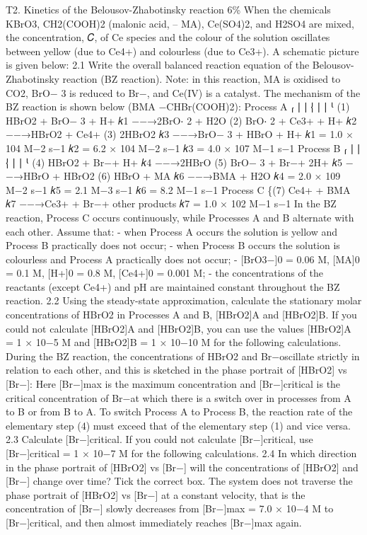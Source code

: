 T2. Kinetics of the Belousov-Zhabotinsky reaction 6\% When the chemicals KBrO3, CH2(COOH)2 (malonic acid, – MA), Ce(SO4)2, and H2SO4 are mixed, the concentration, 𝐶, of Ce species and the colour of the solution oscillates between yellow (due to Ce4+) and colourless (due to Ce3+). A schematic picture is given below: 2.1 Write the overall balanced reaction equation of the Belousov-Zhabotinsky reaction (BZ reaction). Note: in this reaction, MA is oxidised to CO2, BrO− 3 is reduced to Br−, and Ce(IV) is a catalyst. The mechanism of the BZ reaction is shown below (BMA −CHBr(COOH)2): Process A ⎧ ⎪ ⎪ ⎨ ⎪ ⎪ ⎩ (1) HBrO2 + BrO− 3 + H+ 𝑘1 −−→2BrO⋅ 2 + H2O (2) BrO⋅ 2 + Ce3+ + H+ 𝑘2 −−→HBrO2 + Ce4+ (3) 2HBrO2 𝑘3 −−→BrO− 3 + HBrO + H+ 𝑘1 = 1.0 × 104 M−2 s−1 𝑘2 = 6.2 × 104 M−2 s−1 𝑘3 = 4.0 × 107 M−1 s−1 Process B ⎧ ⎪ ⎪ ⎨ ⎪ ⎪ ⎩ (4) HBrO2 + Br−+ H+ 𝑘4 −−→2HBrO (5) BrO− 3 + Br−+ 2H+ 𝑘5 −−→HBrO + HBrO2 (6) HBrO + MA 𝑘6 −−→BMA + H2O 𝑘4 = 2.0 × 109 M−2 s−1 𝑘5 = 2.1 M−3 s−1 𝑘6 = 8.2 M−1 s−1 Process C \{(7) Ce4+ + BMA 𝑘7 −−→Ce3+ + Br−+ other products 𝑘7 = 1.0 × 102 M−1 s−1 In the BZ reaction, Process C occurs continuously, while Processes A and B alternate with each other. Assume that: - when Process A occurs the solution is yellow and Process B practically does not occur; - when Process B occurs the solution is colourless and Process A practically does not occur; - [BrO3−]0 = 0.06 M, [MA]0 = 0.1 M, [H+]0 = 0.8 M, [Ce4+]0 = 0.001 M; - the concentrations of the reactants (except Ce4+) and pH are maintained constant throughout the BZ reaction. 2.2 Using the steady-state approximation, calculate the stationary molar concentrations of HBrO2 in Processes A and B, [HBrO2]A and [HBrO2]B. If you could not calculate [HBrO2]A and [HBrO2]B, you can use the values [HBrO2]A = 1 × 10−5 M and [HBrO2]B = 1 × 10−10 M for the following calculations. During the BZ reaction, the concentrations of HBrO2 and Br−oscillate strictly in relation to each other, and this is sketched in the phase portrait of [HBrO2] vs [Br−]: Here [Br−]max is the maximum concentration and [Br−]critical is the critical concentration of Br−at which there is a switch over in processes from A to B or from B to A. To switch Process A to Process B, the reaction rate of the elementary step (4) must exceed that of the elementary step (1) and vice versa. 2.3 Calculate [Br−]critical. If you could not calculate [Br−]critical, use [Br−]critical = 1 × 10−7 M for the following calculations. 2.4 In which direction in the phase portrait of [HBrO2] vs [Br−] will the concentrations of [HBrO2] and [Br−] change over time? Tick the correct box. The system does not traverse the phase portrait of [HBrO2] vs [Br−] at a constant velocity, that is the concentration of [Br−] slowly decreases from [Br−]max = 7.0 × 10−4 M to [Br−]critical, and then almost immediately reaches [Br−]max again.


